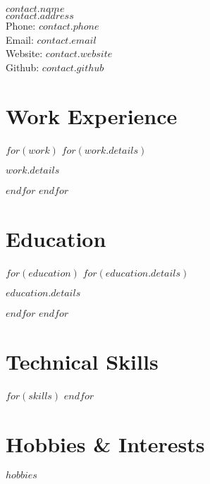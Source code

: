 \documentclass{cv-class}
\begin{document}
{\LARGE $contact.name$}\vspace{3px}\\
$contact.address$\\
Phone: $contact.phone$\\
Email: \href{mailto:$contact.email$}{$contact.email$}\\
Website: \href{https://$contact.website$}{$contact.website$}\\
Github: \href{https://$contact.github$}{$contact.github$}

\section*{Work Experience}
$for(work)$
$for(work.details)$
\begin{workitem}
  \item $work.details$
\end{workitem}
$endfor$
$endfor$

\section*{Education}
$for(education)$
$for(education.details)$
\begin{educationitem}
  \item $education.details$
\end{educationitem}
$endfor$
$endfor$

\section*{Technical Skills}
$for(skills)$
$endfor$

\section*{Hobbies \& Interests}
$hobbies$
\end{document}
